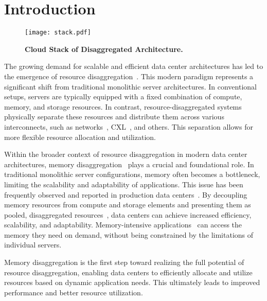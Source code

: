 \chapter{Introduction}
\label{chap:introduction}
\begin{figure}[t]
    \centering
    \texttt{[image: stack.pdf]}
      \caption[Cloud Stack of Disaggregated Architecture]{\textbf{Cloud Stack of Disaggregated Architecture.}} \vspace{-1.0em}
      \label{fig:stack}
\end{figure}
The growing demand for scalable and efficient data center architectures has led to the emergence of resource disaggregation~\cite{mind, legoos, disagg, memdisagg1, memdisagg2, memdisagg3, memdisagg4, memdisagg5, memdisagg6}. This modern paradigm represents a significant shift from traditional monolithic server architectures. In conventional setups, servers are typically equipped with a fixed combination of compute, memory, and storage resources. In contrast, resource-disaggregated systems physically separate these resources and distribute them across various interconnects, such as networks~\cite{disagg, legoos, mind}, CXL~\cite{cxl, cxlasic}, and others. This separation allows for more flexible resource allocation and utilization.

Within the broader context of resource disaggregation in modern data center architectures, memory disaggregation~\cite{memdisagg1, memdisagg2, memdisagg3, memdisagg4, memdisagg5, memdisagg6} plays a crucial and foundational role. In traditional monolithic server configurations, memory often becomes a bottleneck, limiting the scalability and adaptability of applications. This issue has been frequently observed and reported in production data centers~\cite{memory1, memory2, memory3, memory4, memory5, memory6, memory7, memory8, memory9, memory10}. By decoupling memory resources from compute and storage elements and presenting them as pooled, disaggregated resources~\cite{pool1, pool2}, data centers can achieve increased efficiency, scalability, and adaptability. Memory-intensive applications~\cite{redis, ramcloud, sparkmemory} can access the memory they need on demand, without being constrained by the limitations of individual servers.

Memory disaggregation is the first step toward realizing the full potential of resource disaggregation, enabling data centers to efficiently allocate and utilize resources based on dynamic application needs. This ultimately leads to improved performance and better resource utilization.


